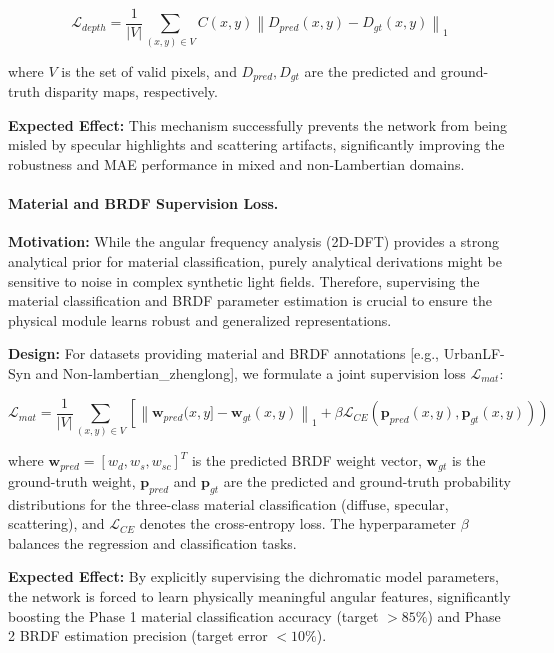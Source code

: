 \begin{equation}
\label{eq:eq48}
\mathcal{L}_{depth} = \frac{1}{|V|} \sum_{(x,y) \in V} C(x,y) \left\| D_{pred}(x,y) - D_{gt}(x,y) \right\|_1
\end{equation}

where $V$ is the set of valid pixels, and $D_{pred}, D_{gt}$ are the predicted and ground-truth disparity maps, respectively. 

\textbf{Expected Effect:} This mechanism successfully prevents the network from being misled by specular highlights and scattering artifacts, significantly improving the robustness and MAE performance in mixed and non-Lambertian domains.

\paragraph{Material and BRDF Supervision Loss.}
\textbf{Motivation:} While the angular frequency analysis (2D-DFT) provides a strong analytical prior for material classification, purely analytical derivations might be sensitive to noise in complex synthetic light fields. Therefore, supervising the material classification and BRDF parameter estimation is crucial to ensure the physical module learns robust and generalized representations.

\textbf{Design:} For datasets providing material and BRDF annotations  [e.g., UrbanLF-Syn and Non-lambertian_zhenglong], we formulate a joint supervision loss $\mathcal{L}_{mat}$:

\begin{equation}
\label{eq:eq49}
\mathcal{L}_{mat} = \frac{1}{|V|} \sum_{(x,y) \in V} \left [ \left\| \mathbf{w}_{pred}(x,y] - \mathbf{w}_{gt}(x,y) \right\|_1 + \beta \mathcal{L}_{CE}(\mathbf{p}_{pred}(x,y), \mathbf{p}_{gt}(x,y)) \right)
\end{equation}

where $\mathbf{w}_{pred} = [w_d, w_s, w_{sc}]^T$ is the predicted BRDF weight vector, $\mathbf{w}_{gt}$ is the ground-truth weight, $\mathbf{p}_{pred}$ and $\mathbf{p}_{gt}$ are the predicted and ground-truth probability distributions for the three-class material classification (diffuse, specular, scattering), and $\mathcal{L}_{CE}$ denotes the cross-entropy loss. The hyperparameter $\beta$ balances the regression and classification tasks.

\textbf{Expected Effect:} By explicitly supervising the dichromatic model parameters, the network is forced to learn physically meaningful angular features, significantly boosting the Phase 1 material classification accuracy (target $>85\%$) and Phase 2 BRDF estimation precision (target error $<10\%$).

